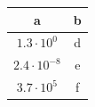\begin{table}[!htbp]
  \centering
  \begin{tabular}{c|c}
    a                   & b \\ \hline
    $1.3 \cdot 10^{0}$  & d \\ \hline
    $2.4 \cdot 10^{-8}$ & e \\ \hline
    $3.7 \cdot 10^{5}$  & f \\
  \end{tabular}
\end{table}